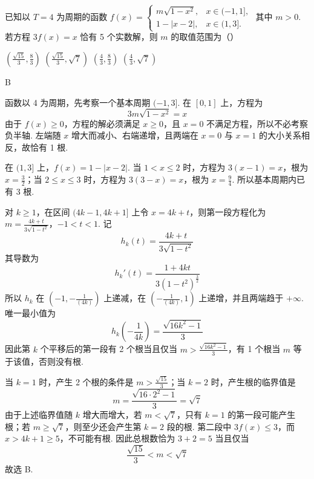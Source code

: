 \begin{problem}
已知以 \(T = 4\) 为周期的函数 \(f(x) = \begin{cases}
m\sqrt{1 - x^{2}}, & x \in (-1, 1],\\
1 - |x - 2|, & x \in (1, 3].
\end{cases}\) 其中 \(m > 0\). 若方程 \(3f(x) = x\) 恰有 5 个实数解，则 \(m\) 的取值范围为（\quad）

\choices
    {\(\left(\frac{\sqrt{15}}{3}, \frac{8}{3}\right)\)}
    {\(\left(\frac{\sqrt{15}}{3}, \sqrt{7}\right)\)}
    {\(\left(\frac{4}{3}, \frac{8}{3}\right)\)}
    {\(\left(\frac{4}{3}, \sqrt{7}\right)\)}

\begin{answer}
B
\end{answer}

\begin{solution}
函数以 4 为周期，先考察一个基本周期 \((-1,3]\). 在 \([0,1]\) 上，方程为
\[
3m\sqrt{1-x^{2}}=x
\]
由于 \(f(x)\geqslant0\)，方程的解必须满足 \(x\geqslant0\)，且 \(x=0\) 不满足方程，所以不必考察负半轴.
左端随 \(x\) 增大而减小、右端递增，且两端在 \(x=0\) 与 \(x=1\) 的大小关系相反，故恰有 1 根.

在 \((1,3]\) 上，\(f(x)=1-|x-2|\). 当 \(1<x\leqslant2\) 时，方程为 \(3(x-1)=x\)，根为 \(x=\frac{3}{2}\)；当 \(2\leqslant x\leqslant3\) 时，方程为 \(3(3-x)=x\)，根为 \(x=\frac{9}{4}\). 所以基本周期内已有 3 根.

对 \(k\geqslant1\)，在区间 \((4k-1,4k+1]\) 上令 \(x=4k+t\)，则第一段方程化为
\(m=\frac{4k+t}{3\sqrt{1-t^{2}}}\)，\(-1<t<1\).
记
\[
h_k(t)=\frac{4k+t}{3\sqrt{1-t^{2}}}
\]
其导数为
\[
h_k'(t)=\frac{1+4kt}{3(1-t^{2})^{\frac{3}{2}}}
\]
所以 \(h_k\) 在 \((-1,-\frac{1}{(4k)})\) 上递减，在 \((-\frac{1}{(4k)},1)\) 上递增，并且两端趋于 \(+\infty\). 唯一最小值为
\[
h_k\left(-\frac1{4k}\right)=\frac{\sqrt{16k^{2}-1}}{3}
\]
因此第 \(k\) 个平移后的第一段有 2 个根当且仅当 \(m>\frac{\sqrt{16k^{2}-1}}{3}\)，有 1 个根当 \(m\) 等于该值，否则没有根.

当 \(k=1\) 时，产生 2 个根的条件是 \(m>\frac{\sqrt{15}}{3}\)；当 \(k=2\) 时，产生根的临界值是
\[
m=\frac{\sqrt{16\cdot2^{2}-1}}{3}=\sqrt7
\]
由于上述临界值随 \(k\) 增大而增大，若 \(m<\sqrt7\)，只有 \(k=1\) 的第一段可能产生根；若 \(m\geqslant\sqrt7\)，则至少还会产生第 \(k=2\) 段的根. 第二段中 \(3f(x)\leqslant3\)，而 \(x>4k+1\geqslant5\)，不可能有根. 因此总根数恰为 \(3+2=5\) 当且仅当
\[
\frac{\sqrt{15}}{3}<m<\sqrt7
\]
故选 B.
\end{solution}
\end{problem}

